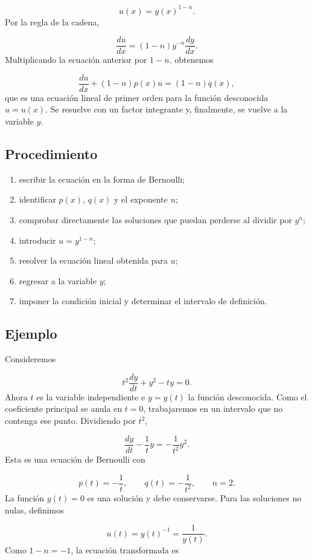 \documentclass[12pt,a4paper]{article}
\begin{document}
	\[
	u(x)=y(x)^{1-n}.
	\]
	Por la regla de la cadena,

	\[
	\frac{du}{dx}
	=
	(1-n)y^{-n}\frac{dy}{dx}.
	\]
	Multiplicando la ecuación anterior por \(1-n\), obtenemos

	\[
	\boxed{
	\frac{du}{dx}
	+(1-n)p(x)u
	=
	(1-n)q(x),
	}
	\]
	que es una ecuación lineal de primer orden para la función desconocida \(u=u(x)\). Se resuelve con un factor integrante y, finalmente, se vuelve a la variable \(y\).

	\subsection{Procedimiento}

	\begin{enumerate}[label=\arabic*.]
		\item escribir la ecuación en la forma de Bernoulli;
		\item identificar \(p(x)\), \(q(x)\) y el exponente \(n\);
		\item comprobar directamente las soluciones que puedan perderse al dividir por \(y^n\);
		\item introducir \(u=y^{1-n}\);
		\item resolver la ecuación lineal obtenida para \(u\);
		\item regresar a la variable \(y\);
		\item imponer la condición inicial y determinar el intervalo de definición.
	\end{enumerate}

	\clearpage
	\subsection{Ejemplo}

	Consideremos

	\[
	t^2\frac{dy}{dt}+y^2-ty=0.
	\]
	Ahora \(t\) es la variable independiente e \(y=y(t)\) la función desconocida. Como el coeficiente principal se anula en \(t=0\), trabajaremos en un intervalo que no contenga ese punto. Dividiendo por \(t^2\),

	\[
	\frac{dy}{dt}-\frac{1}{t}y
	=
	-\frac{1}{t^2}y^2.
	\]
	Esta es una ecuación de Bernoulli con

	\[
	p(t)=-\frac{1}{t},
	\qquad
	q(t)=-\frac{1}{t^2},
	\qquad
	n=2.
	\]
	La función \(y(t)=0\) es una solución y debe conservarse. Para las soluciones no nulas, definimos

	\[
	u(t)=y(t)^{-1}=\frac{1}{y(t)}.
	\]
	Como \(1-n=-1\), la ecuación transformada es
\end{document}
